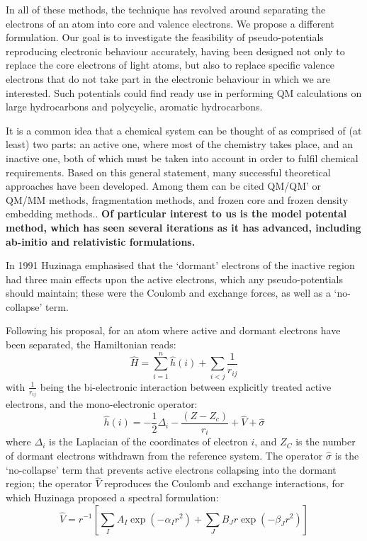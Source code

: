 \documentclass[12pt]{article}
\begin{document}
In all of these methods, the technique has revolved around separating the electrons of an atom into core and valence electrons.
We propose a different formulation.
Our goal is to investigate the feasibility of pseudo-potentials reproducing electronic behaviour accurately,
having been designed not only to replace the core electrons of light atoms,
but also to replace specific valence electrons that do not take part in the electronic behaviour in which we are interested.
Such potentials could find ready use in performing QM calculations on large hydrocarbons and polycyclic, aromatic hydrocarbons.

It is a common idea that a chemical system can be thought of as comprised of (at least) 
two parts:
an active one, where most of the chemistry takes place, and an inactive one, both of which must be taken into account in order to fulfil chemical requirements.
Based on this general statement, many successful theoretical approaches have been developed. Among them can be cited QM/QM' or QM/MM methods,\cite{chung_oniom_2015} fragmentation methods,
\cite{gordon_effective_2001,
steinmann_effective_2012,collins_energy-based_2015} and frozen core and frozen density embedding methods.\cite{assfeld_quantum_1996,jacob_calculation_2006,artemyev_photoelectron_2015,wesolowski_frozen-density_2015}. \textbf{Of particular interest to us is the model potental method, which has seen several iterations as it has advanced, including ab-initio and relativistic formulations.\cite{bonifacic_1974, huzinaga_1987, seino_2014}}

In 1991 Huzinaga emphasised that the `dormant' electrons of the inactive region had three main effects upon the active electrons, which any pseudo-potentials should maintain; these were the Coulomb and exchange forces, as well as a `no-collapse' term.\cite{huzinaga_effective_1991}

Following his proposal, for an atom where active and dormant electrons have been separated, the Hamiltonian reads:
\begin{equation}
\label{eq:atomicHamiltonian}
\hat{H} = \sum_{i=1}^n \hat{h}(i) +\sum_{i<j}\frac{1}{r_{ij}}
\end{equation}
with $\frac{1}{r_{ij}}$ being the bi-electronic interaction
between explicitly treated active electrons, and
the mono-electronic operator:
\begin{equation}
\label{eq:monoElectronicOperator}
\hat{h}(i) = -\frac{1}{2}\Delta_i - \frac{(Z-Z_c)}{r_i} + \hat{V} + \hat{\sigma}
\end{equation}
where $\Delta_i$ is the Laplacian of the coordinates of electron $i$, and 
$Z_C$ is the number of dormant electrons withdrawn from the reference system.
The operator $\hat{\sigma}$ is the `no-collapse' term that prevents active electrons
collapsing into the dormant region; the operator $\hat{V}$ reproduces the 
Coulomb and exchange interactions, for which Huzinaga proposed a spectral formulation:
\begin{equation}
\label{eq:HuzinagaMPVersion1Potential}
\hat{V} = r^{-1}\left[\sum_IA_I\exp(-\alpha_I r^2)+\sum_JB_Jr\exp(-\beta_J r^2)\right]
\end{equation}
\end{document}

